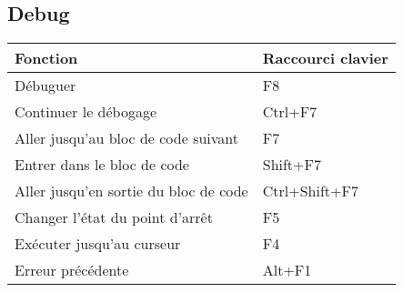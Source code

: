 \subsection{Debug}

\begin{tabular}{|l|l|}\hline
Fonction 		                        &	Raccourci clavier\\ \hline
Débuguer 	                            &   F8\\ \hline
Continuer le débogage 	                &   Ctrl+F7\\ \hline
Aller jusqu'au bloc de code suivant     &   F7\\ \hline
Entrer dans le bloc de code	            &   Shift+F7\\ \hline
Aller jusqu'en sortie du bloc de code	&   Ctrl+Shift+F7\\ \hline
Changer l'état du point d'arrêt 	    &   F5\\ \hline
Exécuter jusqu'au curseur	            &   F4\\ \hline
Erreur précédente	                    &   Alt+F1\\ \hline
\end{tabular}
